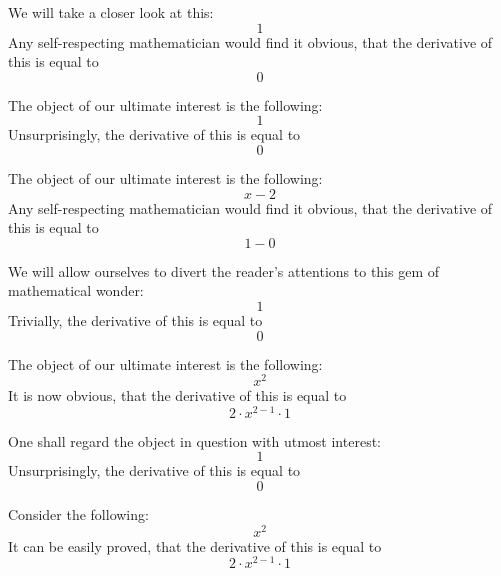 \documentclass{article}
\begin{document}
We will take a closer look at this:
\begin{equation}
1 
\end{equation}
Any self-respecting mathematician would find it obvious, that the derivative of this is equal to
\begin{equation}
0 
\end{equation}

The object of our ultimate interest is the following:
\begin{equation}
1 
\end{equation}
Unsurprisingly, the derivative of this is equal to
\begin{equation}
0 
\end{equation}

The object of our ultimate interest is the following:
\begin{equation}
x - 2 
\end{equation}
Any self-respecting mathematician would find it obvious, that the derivative of this is equal to
\begin{equation}
1 - 0 
\end{equation}

We will allow ourselves to divert the reader's attentions to this gem of mathematical wonder:
\begin{equation}
1 
\end{equation}
Trivially, the derivative of this is equal to
\begin{equation}
0 
\end{equation}

The object of our ultimate interest is the following:
\begin{equation}
x ^{2 } 
\end{equation}
It is now obvious, that the derivative of this is equal to
\begin{equation}
2 \cdot x ^{2 - 1 } \cdot 1 
\end{equation}

One shall regard the object in question with utmost interest:
\begin{equation}
1 
\end{equation}
Unsurprisingly, the derivative of this is equal to
\begin{equation}
0 
\end{equation}

Consider the following:
\begin{equation}
x ^{2 } 
\end{equation}
It can be easily proved, that the derivative of this is equal to
\begin{equation}
2 \cdot x ^{2 - 1 } \cdot 1 
\end{equation}
\end{document}
